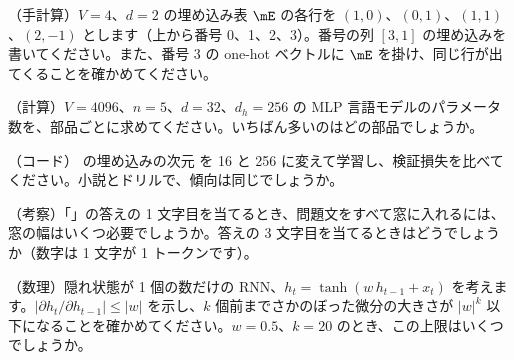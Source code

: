 \begin{exercises}
\item （手計算）$V=4$、$d=2$ の埋め込み表 $\mE$ の各行を $(1,0)$、$(0,1)$、$(1,1)$、$(2,-1)$ とします（上から番号 0、1、2、3）。番号の列 $[3,1]$ の埋め込みを書いてください。また、番号 3 の one-hot ベクトルに $\mE$ を掛け、同じ行が出てくることを確かめてください。
\item （計算）$V=4096$、$n=5$、$d=32$、$d_h=256$ の MLP 言語モデルのパラメータ数を、部品ごとに求めてください。いちばん多いのはどの部品でしょうか。
\item （コード） の埋め込みの次元  を 16 と 256 に変えて学習し、検証損失を比べてください。小説とドリルで、傾向は同じでしょうか。
\item （考察）「」の答えの 1 文字目を当てるとき、問題文をすべて窓に入れるには、窓の幅はいくつ必要でしょうか。答えの 3 文字目を当てるときはどうでしょうか（数字は 1 文字が 1 トークンです）。
\item （数理）隠れ状態が 1 個の数だけの RNN、$h_t=\tanh(w\,h_{t-1}+x_t)$ を考えます。$\left|\partial h_t/\partial h_{t-1}\right|\le|w|$ を示し、$k$ 個前までさかのぼった微分の大きさが $|w|^k$ 以下になることを確かめてください。$w=0.5$、$k=20$ のとき、この上限はいくつでしょうか。
\end{exercises}
